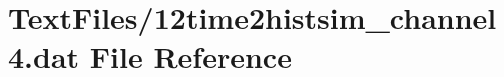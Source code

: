 \hypertarget{12time2histsim__channel4_8dat}{}\section{Text\+Files/12time2histsim\+\_\+channel4.dat File Reference}
\label{12time2histsim__channel4_8dat}
